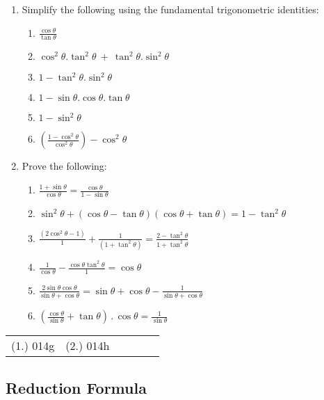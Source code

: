 {
\begin{enumerate}
	\item Simplify the following using the fundamental trigonometric identities:
	\begin{enumerate}
		\item $\frac{\cos\theta }{\tan\theta }$
		\item $\cos^2\theta.\tan^2\theta\ +\ \tan^2\theta.\sin^2\theta$
		\item $1 - \tan^2\theta.\sin^2\theta$
		\item $1 - \sin\theta.\cos\theta.\tan\theta $
		\item $1-\sin^2\theta $
		\item $\left(\frac{1 - \cos^2\theta }{\cos^2\theta }\right) - \cos^2\theta$
	\end{enumerate}
	\item Prove the following:
	\begin{enumerate}
		\item $\frac{1 + \sin\theta}{\cos\theta} = \frac{\cos\theta}{1 - \sin\theta}$
		\item $\sin^2\theta + (\cos\theta - \tan\theta)(\cos\theta + \tan\theta)  = 1 - \tan^2\theta$
		\item $\frac{(2\cos^2\theta - 1)}{1} + \frac{1}{(1 + \tan^2\theta)} = \frac{2 - \tan^2\theta}{1 + \tan^2\theta}$
		\item $\frac{1}{\cos\theta} - \frac{\cos\theta\tan^2\theta}{1} = \cos\theta$
		\item $\frac{2\sin\theta\cos\theta}{\sin\theta+\cos\theta} = \sin\theta+\cos\theta - \frac{1}{\sin\theta+\cos\theta}$
		\item $\left(\frac{\cos\theta}{\sin\theta} + \tan\theta \right)\,.\,\cos\theta = \frac{1}{\sin\theta}$
	\end{enumerate}
\end{enumerate}


\par \practiceinfo
\par \begin{tabular}[h]{cccccc}
(1.)	014g	&
(2.)	014h	&
\end{tabular}}


\subsection{Reduction Formula}

